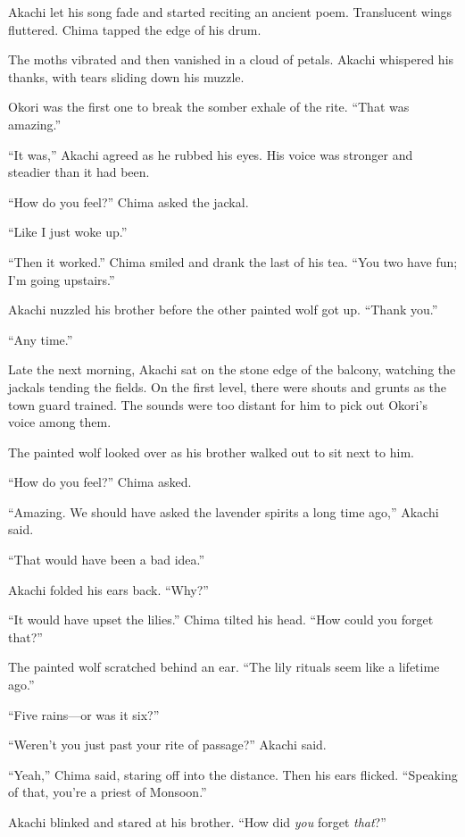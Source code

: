 Akachi let his song fade and started reciting an ancient poem. Translucent wings fluttered. Chima tapped the edge of his drum.

The moths vibrated and then vanished in a cloud of petals. Akachi whispered his thanks, with tears sliding down his muzzle. 

Okori was the first one to break the somber exhale of the rite. ``That was amazing.''

``It was,'' Akachi agreed as he rubbed his eyes. His voice was stronger and steadier than it had been.

``How do you feel?'' Chima asked the jackal. 

``Like I just woke up.''

``Then it worked.'' Chima smiled and drank the last of his tea. ``You two have fun; I'm going upstairs.''

Akachi nuzzled his brother before the other painted wolf got up. ``Thank you.''

``Any time.''

\secdiv

\noindent Late the next morning, Akachi sat on the stone edge of the balcony, watching the jackals tending the fields. On the first level, there were shouts and grunts as the town guard trained. The sounds were too distant for him to pick out Okori's voice among them.

The painted wolf looked over as his brother walked out to sit next to him. 

``How do you feel?'' Chima asked.

``Amazing. We should have asked the lavender spirits a long time ago,'' Akachi said.

``That would have been a bad idea.''

Akachi folded his ears back. ``Why?''

``It would have upset the lilies.'' Chima tilted his head. ``How could you forget that?''

The painted wolf scratched behind an ear. ``The lily rituals seem like a lifetime ago.''

``Five rains---or was it six?''

``Weren't you just past your rite of passage?'' Akachi said.

``Yeah,'' Chima said, staring off into the distance. Then his ears flicked. ``Speaking of that, you're a priest of Monsoon.''

Akachi blinked and stared at his brother. ``How did \emph{you} forget \emph{that}?''

